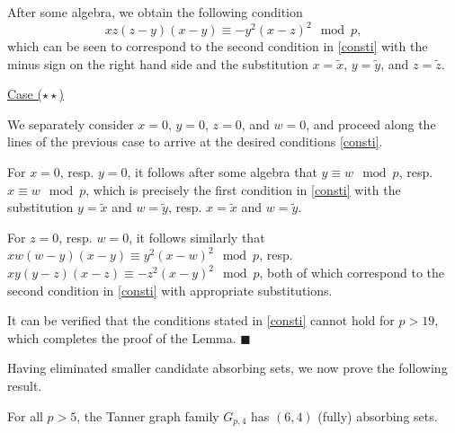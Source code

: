 After some algebra, we obtain the following condition
\begin{equation}
xz(z-y)(x-y) \equiv -y^2(x-z)^2 \mod p,
\end{equation}
which can be seen to correspond to the second condition in
\eqref{consti} with the minus sign on the right hand side and the
substitution $x=\tilde{x}$, $y=\tilde{y}$, and $z=\tilde{z}$.

\underline{Case ($\star\star$)}

We separately consider $x=0$, $y=0$, $z=0$, and $w=0$, and proceed
along the lines of the previous case to arrive at the desired
conditions \eqref{consti}.

For $x=0$, resp. $y=0$, it follows after some algebra that $y
\equiv w \mod p$, resp. $x \equiv w \mod p$, which is precisely
the first condition in \eqref{consti} with the substitution
$y=\tilde{x}$ and $w=\tilde{y}$, resp. $x=\tilde{x}$ and
$w=\tilde{y}$.


For $z=0$, resp. $w=0$, it follows similarly that $xw(w-y)(x-y)
\equiv y^2(x-w)^2 \mod p$, resp. $xy(y-z)(x-z) \equiv -z^2(x-y)^2
\mod p$, both of which correspond to the second condition in
\eqref{consti} with appropriate substitutions.


It can be verified that the conditions stated in \eqref{consti}
cannot hold for $p>19$, which completes the proof of the Lemma.
\hfill$\blacksquare$

Having eliminated smaller candidate absorbing sets, we now prove
the following result.

\begin{lemma}\label{Lem5} For all $p > 5$, the Tanner graph family $G_{p,4}$ has $(6,4)$ (fully) absorbing
sets.
\end{lemma}


